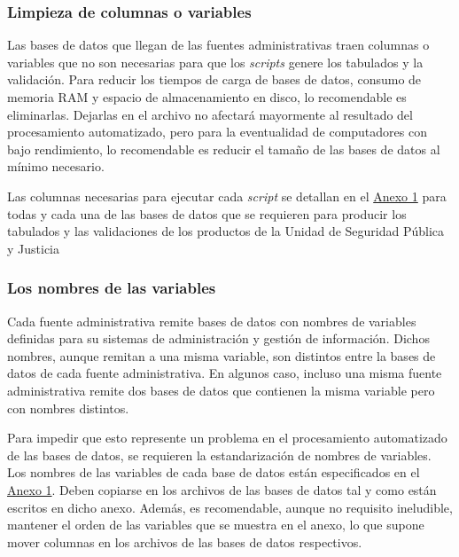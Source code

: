 \documentclass[
  spanish,
]{book}
\begin{document}
\hypertarget{limpieza-de-columnas-o-variables}{%
\subsubsection{Limpieza de columnas o variables}\label{limpieza-de-columnas-o-variables}}

Las bases de datos que llegan de las fuentes administrativas traen columnas o variables que no son necesarias para que los \emph{scripts} genere los tabulados y la validación. Para reducir los tiempos de carga de bases de datos, consumo de memoria RAM y espacio de almacenamiento en disco, lo recomendable es eliminarlas. Dejarlas en el archivo no afectará mayormente al resultado del procesamiento automatizado, pero para la eventualidad de computadores con bajo rendimiento, lo recomendable es reducir el tamaño de las bases de datos al mínimo necesario.

Las columnas necesarias para ejecutar cada \emph{script} se detallan en el \protect\hyperlink{anexo1}{Anexo 1} para todas y cada una de las bases de datos que se requieren para producir los tabulados y las validaciones de los productos de la Unidad de Seguridad Pública y Justicia

\hypertarget{los-nombres-de-las-variables}{%
\subsubsection{Los nombres de las variables}\label{los-nombres-de-las-variables}}

Cada fuente administrativa remite bases de datos con nombres de variables definidas para su sistemas de administración y gestión de información. Dichos nombres, aunque remitan a una misma variable, son distintos entre la bases de datos de cada fuente administrativa. En algunos caso, incluso una misma fuente administrativa remite dos bases de datos que contienen la misma variable pero con nombres distintos.

Para impedir que esto represente un problema en el procesamiento automatizado de las bases de datos, se requieren la estandarización de nombres de variables. Los nombres de las variables de cada base de datos están especificados en el \protect\hyperlink{anexo1}{Anexo 1}. Deben copiarse en los archivos de las bases de datos tal y como están escritos en dicho anexo. Además, es recomendable, aunque no requisito ineludible, mantener el orden de las variables que se muestra en el anexo, lo que supone mover columnas en los archivos de las bases de datos respectivos.
\end{document}
